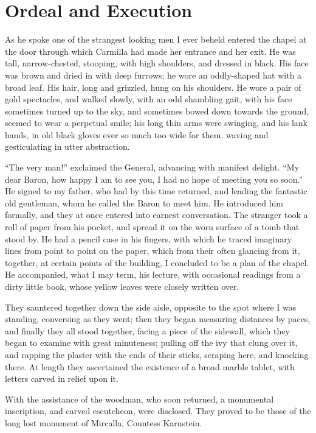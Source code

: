 \documentclass[11pt,twoside,makeidx,hidelinks,]{memoir}
\begin{document}
\chapter{Ordeal and Execution}\hypertarget{ordeal-and-execution}{}\label{ordeal-and-execution}

As he spoke one of the strangest looking men I ever beheld entered the
chapel at the door through which Carmilla had made her entrance and her
exit. He was tall, narrow-chested, stooping, with high shoulders, and
dressed in black. His face was brown and dried in with deep furrows; he
wore an oddly-shaped hat with a broad leaf. His hair, long and grizzled,
hung on his shoulders. He wore a pair of gold spectacles, and walked
slowly, with an odd shambling gait, with his face sometimes turned up to
the sky, and sometimes bowed down towards the ground, seemed to wear a
perpetual smile; his long thin arms were swinging, and his lank hands,
in old black gloves ever so much too wide for them, waving and
gesticulating in utter abstraction.

``The very man!'' exclaimed the General, advancing with manifest delight.
``My dear Baron, how happy I am to see you, I had no hope of meeting you
so soon.'' He signed to my father, who had by this time returned, and
leading the fantastic old gentleman, whom he called the Baron to meet
him. He introduced him formally, and they at once entered into earnest
conversation. The stranger took a roll of paper from his pocket, and
spread it on the worn surface of a tomb that stood by. He had a pencil
case in his fingers, with which he traced imaginary lines from point to
point on the paper, which from their often glancing from it, together,
at certain points of the building, I concluded to be a plan of the
chapel. He accompanied, what I may term, his lecture, with occasional
readings from a dirty little book, whose yellow leaves were closely
written over.

They sauntered together down the side aisle, opposite to the spot where
I was standing, conversing as they went; then they began measuring
distances by paces, and finally they all stood together, facing a piece
of the sidewall, which they began to examine with great minuteness;
pulling off the ivy that clung over it, and rapping the plaster with the
ends of their sticks, scraping here, and knocking there. At length they
ascertained the existence of a broad marble tablet, with letters carved
in relief upon it.

With the assistance of the woodman, who soon returned, a monumental
inscription, and carved escutcheon, were disclosed. They proved to be
those of the long lost monument of Mircalla, Countess Karnstein.
\end{document}
